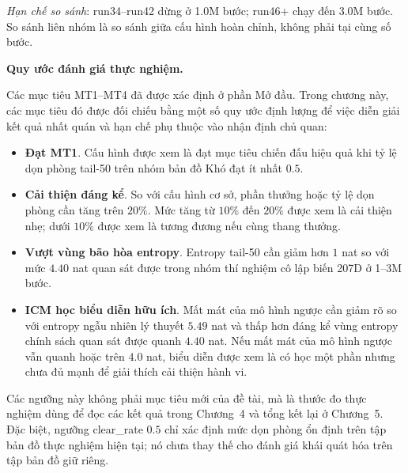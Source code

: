 \textit{Hạn chế so sánh}: run34--run42 dừng ở 1.0M bước; run46+ chạy đến 3.0M bước. So sánh liên nhóm là so sánh giữa cấu hình hoàn chỉnh, không phải tại cùng số bước.

\label{sec:eval_thresholds}
\textbf{Quy ước đánh giá thực nghiệm.}

Các mục tiêu MT1--MT4 đã được xác định ở phần Mở đầu. Trong chương này, các mục tiêu đó được đối chiếu bằng một số quy ước định lượng để việc diễn giải kết quả nhất quán và hạn chế phụ thuộc vào nhận định chủ quan:

\begin{itemize}
    \item \textbf{Đạt MT1}. Cấu hình được xem là đạt mục tiêu chiến đấu hiệu quả khi tỷ lệ dọn phòng tail-50 trên nhóm bản đồ Khó đạt ít nhất $0.5$.
    \item \textbf{Cải thiện đáng kể}. So với cấu hình cơ sở, phần thưởng hoặc tỷ lệ dọn phòng cần tăng trên $20\%$. Mức tăng từ $10\%$ đến $20\%$ được xem là cải thiện nhẹ; dưới $10\%$ được xem là tương đương nếu cùng thang thưởng.
    \item \textbf{Vượt vùng bão hòa entropy}. Entropy tail-50 cần giảm hơn $1$ nat so với mức $4.40$ nat quan sát được trong nhóm thí nghiệm cô lập biến 207D ở 1--3M bước.
    \item \textbf{ICM học biểu diễn hữu ích}. Mất mát của mô hình ngược cần giảm rõ so với entropy ngẫu nhiên lý thuyết $5.49$ nat và thấp hơn đáng kể vùng entropy chính sách quan sát được quanh $4.40$ nat. Nếu mất mát của mô hình ngược vẫn quanh hoặc trên $4.0$ nat, biểu diễn được xem là có học một phần nhưng chưa đủ mạnh để giải thích cải thiện hành vi.
\end{itemize}

Các ngưỡng này không phải mục tiêu mới của đề tài, mà là thước đo thực nghiệm dùng để đọc các kết quả trong Chương~4 và tổng kết lại ở Chương~5. Đặc biệt, ngưỡng clear\_rate $0.5$ chỉ xác định mức dọn phòng ổn định trên tập bản đồ thực nghiệm hiện tại; nó chưa thay thế cho đánh giá khái quát hóa trên tập bản đồ giữ riêng.

